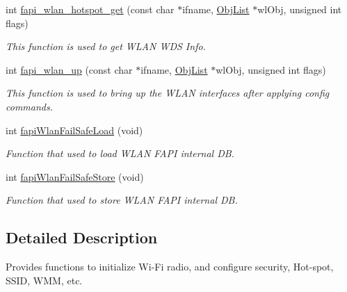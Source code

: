 \begin{DoxyCompactItemize}
int \hyperlink{group__FAPI__WLAN_gaebd863d41366698931f84b707234605c}{fapi\-\_\-wlan\-\_\-hotspot\-\_\-get} (const char $\ast$ifname, \hyperlink{structObjList}{Obj\-List} $\ast$wl\-Obj, unsigned int flags)
\begin{DoxyCompactList}\small\item\em This function is used to get W\-L\-A\-N W\-D\-S Info. \end{DoxyCompactList}\item 
int \hyperlink{group__FAPI__WLAN_gabf31123deafb853f11a0add27f5e4154}{fapi\-\_\-wlan\-\_\-up} (const char $\ast$ifname, \hyperlink{structObjList}{Obj\-List} $\ast$wl\-Obj, unsigned int flags)
\begin{DoxyCompactList}\small\item\em This function is used to bring up the W\-L\-A\-N interfaces after applying config commands. \end{DoxyCompactList}\item 
int \hyperlink{group__FAPI__WLAN_ga5af32583c6fcce723f98afbfd3bca6ec}{fapi\-Wlan\-Fail\-Safe\-Load} (void)
\begin{DoxyCompactList}\small\item\em Function that used to load W\-L\-A\-N F\-A\-P\-I internal D\-B. \end{DoxyCompactList}\item 
int \hyperlink{group__FAPI__WLAN_ga54ee8f057769ad395252adc566dc8885}{fapi\-Wlan\-Fail\-Safe\-Store} (void)
\begin{DoxyCompactList}\small\item\em Function that used to store W\-L\-A\-N F\-A\-P\-I internal D\-B. \end{DoxyCompactList}\end{DoxyCompactItemize}


\subsection{Detailed Description}
Provides functions to initialize Wi-\/\-Fi radio, and configure security, Hot-\/spot, S\-S\-I\-D, W\-M\-M, etc. 


